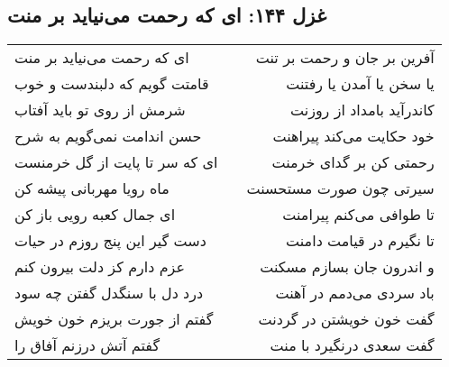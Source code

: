 \begin{center}
\section*{غزل ۱۴۴: ای که رحمت می‌نیاید بر منت}
\label{sec:144}
\begin{longtable}{l p{0.5cm} r}
ای که رحمت می‌نیاید بر منت
&&
آفرین بر جان و رحمت بر تنت
\\
قامتت گویم که دلبندست و خوب
&&
یا سخن یا آمدن یا رفتنت
\\
شرمش از روی تو باید آفتاب
&&
کاندرآید بامداد از روزنت
\\
حسن اندامت نمی‌گویم به شرح
&&
خود حکایت می‌کند پیراهنت
\\
ای که سر تا پایت از گل خرمنست
&&
رحمتی کن بر گدای خرمنت
\\
ماه رویا مهربانی پیشه کن
&&
سیرتی چون صورت مستحسنت
\\
ای جمال کعبه رویی باز کن
&&
تا طوافی می‌کنم پیرامنت
\\
دست گیر این پنج روزم در حیات
&&
تا نگیرم در قیامت دامنت
\\
عزم دارم کز دلت بیرون کنم
&&
و اندرون جان بسازم مسکنت
\\
درد دل با سنگدل گفتن چه سود
&&
باد سردی می‌دمم در آهنت
\\
گفتم از جورت بریزم خون خویش
&&
گفت خون خویشتن در گردنت
\\
گفتم آتش درزنم آفاق را
&&
گفت سعدی درنگیرد با منت
\\
\end{longtable}
\end{center}
